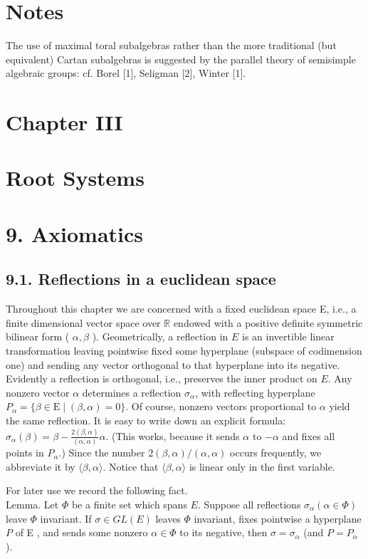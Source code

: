 \documentclass[10pt]{article}
\begin{document}
\section*{Notes}
The use of maximal toral subalgebras rather than the more traditional (but equivalent) Cartan subalgebras is suggested by the parallel theory of semisimple algebraic groups: cf. Borel [1], Seligman [2], Winter [1].

\section*{Chapter III}
\section*{Root Systems}
\section*{9. Axiomatics}
\subsection*{9.1. Reflections in a euclidean space}
Throughout this chapter we are concerned with a fixed euclidean space E, i.e., a finite dimensional vector space over $\mathbb{R}$ endowed with a positive definite symmetric bilinear form ( $\alpha, \beta$ ). Geometrically, a reflection in $E$ is an invertible linear transformation leaving pointwise fixed some hyperplane (subspace of codimension one) and sending any vector orthogonal to that hyperplane into its negative. Evidently a reflection is orthogonal, i.e., preserves the inner product on $E$. Any nonzero vector $\alpha$ determines a reflection $\sigma_{\alpha}$, with reflecting hyperplane $P_{\alpha}=\{\beta \in \mathrm{E} \mid(\beta, \alpha)=0\}$. Of course, nonzero vectors proportional to $\alpha$ yield the same reflection. It is easy to write down an explicit formula: $\sigma_{\alpha}(\beta)=\beta-\frac{2(\beta, \alpha)}{(\alpha, \alpha)} \alpha$. (This works, because it sends $\alpha$ to $-\alpha$ and fixes all points in $P_{\alpha}$.) Since the number $2(\beta, \alpha) /(\alpha, \alpha)$ occurs frequently, we abbreviate it by $\langle\beta, \alpha\rangle$. Notice that $\langle\beta, \alpha\rangle$ is linear only in the first variable.

For later use we record the following fact.\\
Lemma. Let $\Phi$ be a finite set which spans $E$. Suppose all reflections $\sigma_{\alpha}(\alpha \in \Phi)$ leave $\Phi$ invariant. If $\sigma \in G L(E)$ leaves $\Phi$ invariant, fixes pointwise a hyperplane $P$ of E , and sends some nonzero $\alpha \in \Phi$ to its negative, then $\sigma=\sigma_{\alpha}$ (and $P=P_{\alpha}$ ).
\end{document}

